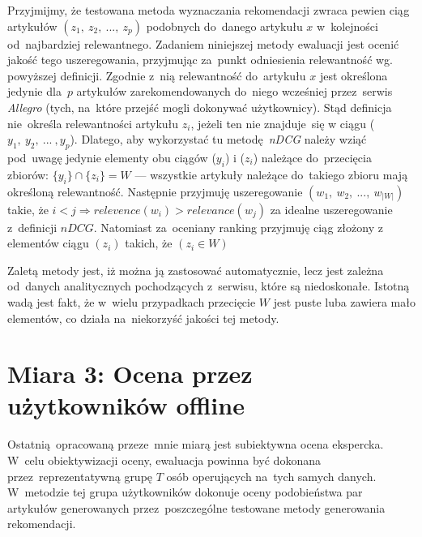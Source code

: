 \documentclass[pl]{minipw} %
\begin{document}
Przyjmijmy, że testowana metoda wyznaczania rekomendacji zwraca pewien ciąg artykułów $(z_1,\ z_2,\ ...,\ z_p)$ podobnych do~danego artykułu $x$ w~kolejności od~najbardziej relewantnego. Zadaniem niniejszej metody ewaluacji jest ocenić jakość tego uszeregowania, przyjmując za~punkt odniesienia relewantność wg. powyższej definicji. Zgodnie z~nią relewantność do~artykułu $x$ jest określona jedynie dla~$p$ artykułów zarekomendowanych do~niego wcześniej przez~serwis \textit{Allegro} (tych, na~które przejść mogli dokonywać użytkownicy). Stąd definicja nie~określa relewantności artykułu $z_i$, jeżeli ten nie znajduje~się w ciągu ($y_1,\ y_2,\ ...\ ,y_p$). Dlatego, aby wykorzystać tu metodę \textit{nDCG} należy wziąć pod~uwagę jedynie elementy obu ciągów ($y_i$) i ($z_i$) należące do~przecięcia zbiorów: $\{y_i\} \cap \{z_i\} = W$ --- wszystkie artykuły należące do~takiego zbioru mają określoną relewantność. Następnie przyjmuję uszeregowanie $(w_1,\ w_2,\ ...,\ w_{|W|})$ takie, że $i<j \Rightarrow relevence(w_i) > relevance(w_j)$ za idealne uszeregowanie z~definicji $nDCG$. Natomiast za~oceniany ranking przyjmuję ciąg złożony z elementów ciągu $(z_i)$ takich, że $(z_i \in W)$ 

Zaletą metody jest, iż można ją zastosować automatycznie, lecz jest zależna od~danych analitycznych pochodzących z~serwisu, które są niedoskonałe. Istotną wadą jest fakt, że w~wielu przypadkach przecięcie $W$ jest puste luba zawiera mało elementów, co działa na~niekorzyść jakości tej metody.

\section{Miara 3: Ocena przez użytkowników offline}

Ostatnią opracowaną przeze~mnie miarą jest subiektywna ocena ekspercka. W~celu obiektywizacji oceny, ewaluacja powinna być dokonana przez~reprezentatywną grupę $T$ osób operujących na~tych samych danych. W~metodzie tej grupa użytkowników dokonuje oceny podobieństwa par artykułów generowanych przez~poszczególne testowane metody generowania rekomendacji.
\end{document}
